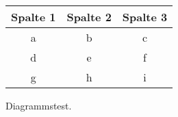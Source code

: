 \documentclass[a4paper,12pt]{report}
\begin{document}
\begin{chart}
    \centering
    \begin{threeparttable}
        \begin{tabular}{|c|c|c|} \hline 
            Spalte 1    &   Spalte 2    &   Spalte 3 \\ \hline
            a       &   b       &   c \\ \hline
            d       &   e       &   f \\ \hline
            g       &   h       &   i \\ \hline
        \end{tabular}
        \caption{Diagrammstest.}
    \end{threeparttable}
\end{chart}

\listofcharts
    \listoftables
\end{document}
